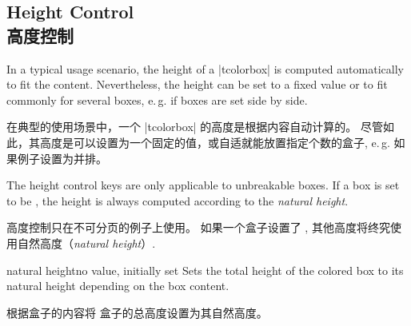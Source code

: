 \setcounter{section}{4}
\setcounter{subsection}{9}
\setcounter{subsubsection}{0}
\subsection{Height Control\\高度控制}\label{sec:heightcontrol}

In a typical usage scenario, the height of a |tcolorbox| is computed automatically
to fit the content. Nevertheless, the height can be set to a fixed value
or to fit commonly for several boxes, e.\,g. if boxes are set side by side.
 
在典型的使用场景中，一个 |tcolorbox| 的高度是根据内容自动计算的。 
尽管如此，其高度是可以设置为一个固定的值，或自适就能放置指定个数的盒子, e.\,g. 如果例子设置为并排。

\bigskip
\begin{marker}
The height control keys are only applicable to unbreakable boxes.
If a box is set to be , the height is always
computed according to the \emph{natural height}.

高度控制只在不可分页的例子上使用。
如果一个盒子设置了 , 其他高度将终究使用自然高度（\emph{natural height}）.
\end{marker}
\bigskip


\begin{docTcbKey}{natural height}{}{no value, initially set}
Sets the total height of the colored box to its natural height depending
on the box content.

根据盒子的内容将%
盒子的总高度设置为其自然高度。
\end{docTcbKey}


